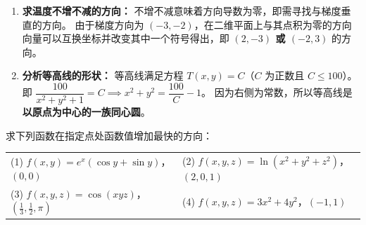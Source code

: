 \documentclass[lang=cn,11pt]{elegantbook}
\begin{document}
\begin{solution}
\begin{enumerate}
  \item[(5)] \textbf{求温度不增不减的方向：}
  不增不减意味着方向导数为零，即需寻找与梯度垂直的方向。
  由于梯度方向为 $(-3,-2)$，在二维平面上与其点积为零的方向向量可以互换坐标并改变其中一个符号得出，即 \textbf{$(2,-3)$ 或 $(-2,3)$} 的方向。

  \item[(6)] \textbf{分析等高线的形状：}
  等高线满足方程 $T(x,y) = C$（$C$ 为正数且 $C \leq 100$）。
  即 $\dfrac{100}{x^2+y^2+1} = C \implies x^2+y^2 = \dfrac{100}{C} - 1$。
  因为右侧为常数，所以等高线是\textbf{以原点为中心的一族同心圆}。
\end{enumerate}
\end{solution}

\begin{exercise}[最速上升方向求解]
求下列函数在指定点处函数值增加最快的方向：\\
\begin{tabular}{p{} p{}}
(1) $f(x,y)=e^x(\cos y+\sin y)$，$(0,0)$ & (2) $f(x,y,z)=\ln(x^2+y^2+z^2)$，$(2,0,1)$ \\
(3) $f(x,y,z)=\cos(xyz)$，$\left(\frac{1}{3},\frac{1}{2},\pi\right)$ & (4) $f(x,y,z)=3x^2+4y^2$，$(-1,1)$
\end{tabular}
\end{exercise}
\end{document}
